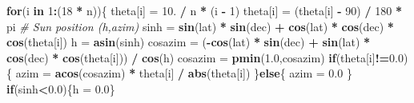 \documentclass[
]{book}
\newenvironment{Shaded}{\begin{snugshade}}{\end{snugshade}}
\newcommand{\CommentTok}[1]{\textcolor[rgb]{0.56,0.35,0.01}{\textit{#1}}}
\newcommand{\ControlFlowTok}[1]{\textcolor[rgb]{0.13,0.29,0.53}{\textbf{#1}}}
\newcommand{\DecValTok}[1]{\textcolor[rgb]{0.00,0.00,0.81}{#1}}
\newcommand{\FloatTok}[1]{\textcolor[rgb]{0.00,0.00,0.81}{#1}}
\newcommand{\KeywordTok}[1]{\textcolor[rgb]{0.13,0.29,0.53}{\textbf{#1}}}
\newcommand{\NormalTok}[1]{#1}
\newcommand{\OperatorTok}[1]{\textcolor[rgb]{0.81,0.36,0.00}{\textbf{#1}}}
\newcommand{\StringTok}[1]{\textcolor[rgb]{0.31,0.60,0.02}{#1}}
\begin{document}
\begin{Shaded}
\begin{Highlighting}[]
  \ControlFlowTok{for}\NormalTok{(i }\ControlFlowTok{in} \DecValTok{1}\OperatorTok{:}\NormalTok{(}\DecValTok{18} \OperatorTok{*}\StringTok{ }\NormalTok{n))\{}
\NormalTok{    theta[i] =}\StringTok{ }\FloatTok{10.} \OperatorTok{/}\StringTok{ }\NormalTok{n }\OperatorTok{*}\StringTok{ }\NormalTok{(i }\OperatorTok{-}\StringTok{ }\DecValTok{1}\NormalTok{)}
\NormalTok{    theta[i] =}\StringTok{ }\NormalTok{(theta[i] }\OperatorTok{-}\StringTok{ }\DecValTok{90}\NormalTok{) }\OperatorTok{/}\StringTok{ }\DecValTok{180} \OperatorTok{*}\StringTok{ }\NormalTok{pi}
    \CommentTok{# Sun position (h,azim)}
\NormalTok{    sinh =}\StringTok{ }\KeywordTok{sin}\NormalTok{(lat) }\OperatorTok{*}\StringTok{ }\KeywordTok{sin}\NormalTok{(dec) }\OperatorTok{+}\StringTok{ }\KeywordTok{cos}\NormalTok{(lat) }\OperatorTok{*}\StringTok{ }\KeywordTok{cos}\NormalTok{(dec) }\OperatorTok{*}\StringTok{ }\KeywordTok{cos}\NormalTok{(theta[i])}
\NormalTok{    h =}\StringTok{ }\KeywordTok{asin}\NormalTok{(sinh)}
\NormalTok{    cosazim =}\StringTok{ }\NormalTok{(}\OperatorTok{-}\KeywordTok{cos}\NormalTok{(lat) }\OperatorTok{*}\StringTok{ }\KeywordTok{sin}\NormalTok{(dec) }\OperatorTok{+}\StringTok{ }\KeywordTok{sin}\NormalTok{(lat) }\OperatorTok{*}\StringTok{ }\KeywordTok{cos}\NormalTok{(dec) }\OperatorTok{*}\StringTok{ }\KeywordTok{cos}\NormalTok{(theta[i])) }\OperatorTok{/}\StringTok{ }\KeywordTok{cos}\NormalTok{(h)}
\NormalTok{    cosazim =}\StringTok{ }\KeywordTok{pmin}\NormalTok{(}\FloatTok{1.0}\NormalTok{,cosazim)}
    \ControlFlowTok{if}\NormalTok{(theta[i]}\OperatorTok{!=}\FloatTok{0.0}\NormalTok{)\{}
\NormalTok{      azim =}\StringTok{ }\KeywordTok{acos}\NormalTok{(cosazim) }\OperatorTok{*}\StringTok{ }\NormalTok{theta[i] }\OperatorTok{/}\StringTok{ }\KeywordTok{abs}\NormalTok{(theta[i])}
\NormalTok{    \}}\ControlFlowTok{else}\NormalTok{\{}
\NormalTok{      azim =}\StringTok{ }\FloatTok{0.0}
\NormalTok{    \}}
    \ControlFlowTok{if}\NormalTok{(sinh}\OperatorTok{<}\FloatTok{0.0}\NormalTok{)\{h =}\StringTok{ }\FloatTok{0.0}\NormalTok{\}}
    

\end{Highlighting}
\end{Shaded}
\end{document}

